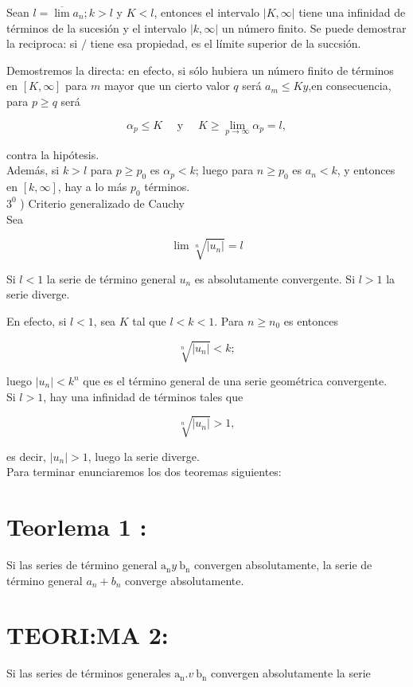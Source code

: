 \documentclass[10pt]{article}
\theoremstyle{plain}
\theoremstyle{definition}
\theoremstyle{remark}
\begin{document}
Sean $l=\overline{\lim } a_{n} ; k>l$ y $K<l$, entonces el intervalo $|K, \infty|$ tiene una infinidad de términos de la sucesión y el intervalo $|k, \infty|$ un número finito. Se puede demostrar la reciproca: si $/$ tiene esa propiedad, es el límite superior de la succsión.

Demostremos la directa: en efecto, si sólo hubiera un número finito de términos en $[K, \infty]$ para $m$ mayor que un cierto valor $q$ será $a_{m} \leqslant K y$,en consecuencia, para $p \geqslant q$ será

$$
\alpha_{p} \leqslant K \quad \text { y } \quad K \geqslant \lim _{p \rightarrow \infty} \alpha_{p}=l,
$$

contra la hipótesis.\\
Además, si $k>l$ para $p \geqslant p_{0}$ es $\alpha_{p}<k$; luego para $n \geqslant p_{0}$ es $a_{n}<k$, y entonces en $[k, \infty]$, hay a lo más $p_{0}$ términos.\\
$3^{0}$ ) Criterio generalizado de Cauchy\\
Sea

$$
\lim \sqrt[n]{\left|u_{n}\right|}=l
$$

Si $l<1$ la serie de término general $u_{n}$ es absolutamente convergente. Si $l>1$ la serie diverge.

En efecto, si $l<1$, sea $K$ tal que $l<k<1$. Para $n \geqslant n_{0}$ es entonces

$$
\sqrt[n]{\left|u_{n}\right|}<k ;
$$

luego $\left|u_{n}\right|<k^{n}$ que es el término general de una serie geométrica convergente.\\
Si $l>1$, hay una infinidad de términos tales que

$$
\sqrt[n]{\left|u_{n}\right|}>1,
$$

es decir, $\left|u_{n}\right|>1$, luego la serie diverge.\\
Para terminar enunciaremos los dos teoremas siguientes:

\section*{Teorlema 1 :}
Si las series de término general $\mathrm{a}_{\mathrm{n}} y \mathrm{~b}_{\mathrm{n}}$ convergen absolutamente, la serie de término general $a_{n}+b_{n}$ converge absolutamente.

\section*{TEORI:MA 2:}
Si las series de términos generales $\mathrm{a}_{\mathrm{n}} . v \mathrm{~b}_{\mathrm{n}}$ convergen absolutamente la serie
\end{document}
